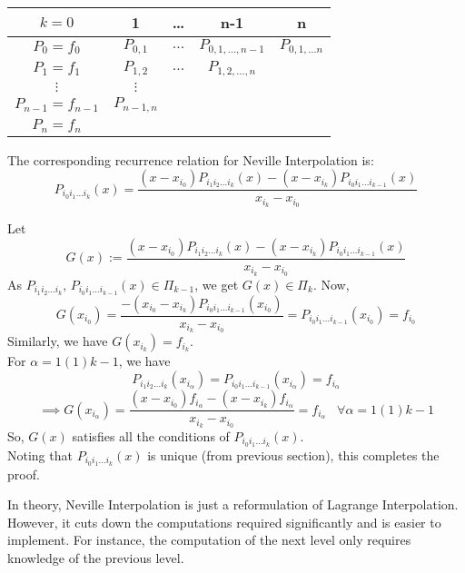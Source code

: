 \begin{center}
   \begin{tabular}{|ccccc|}
        \hline
        $k = 0$& 1 &\dots & n-1 & n\\
        \hline
        $ P_0 = f_0$& $P_{0,1}$ & $\dots$ & $P_{0,1,\dots,n-1}$ & $P_{0,1,\dots n}$\\
        $ P_1 = f_1$ & $P_{1,2}$ & $\dots$ & $P_{1,2,\dots,n}$&\\
        $\vdots$ & $\vdots$ &  &  & \\
        $ P_{n-1} = f_{n-1}$ & $P_{n-1,n}$ &  & & \\
        $ P_{n} = f_{n}$ & & & & \\
        \hline
    \end{tabular}
\end{center}



\begin{props}
    The corresponding recurrence relation for Neville Interpolation is:
    $$P_{i_0i_1\dots i_k}(x) = \frac{(x-x_{i_0})P_{i_1i_2\dots i_k}(x)-(x-x_{i_k})P_{i_0i_1\dots i_{k-1}}(x)}{x_{i_k} - x_{i_0}}$$
\end{props}
\begin{prf}
    Let $$G(x):=\frac{(x-x_{i_0})P_{i_1i_2\dots i_k}(x)-(x-x_{i_k})P_{i_0i_1\dots i_{k-1}}(x)}{x_{i_k} - x_{i_0}}$$
    As $P_{i_1i_2\dots i_k}\text{, }P_{i_0i_1\dots i_{k-1}}(x) \in \Pi_{k-1}$, we get $G(x) \in \Pi_k$.
    Now, $$G(x_{i_0}) = \frac{-(x_{i_0}-x_{i_k})P_{i_0i_1\dots i_{k-1}}(x_{i_0})}{x_{i_k} - x_{i_0}} =  P_{i_0i_1\dots i_{k-1}}(x_{i_0}) = f_{i_0}$$
    Similarly, we have $G(x_{i_k}) = f_{i_k}$.\\
    For $\alpha = 1(1)k-1$, we have 
    $$P_{i_1i_2\dots i_k}(x_{i_\alpha}) = P_{i_0i_1\dots i_{k-1}}(x_{i_\alpha}) = f_{i_\alpha}$$
    $$\implies G(x_{i_\alpha}) = \frac{(x-x_{i_0})f_{i_\alpha}-(x-x_{i_k})f_{i_\alpha}}{x_{i_k} - x_{i_0}} = f_{i_\alpha}\;\;\;\forall \alpha = 1(1)k-1$$
    So, $G(x)$ satisfies all the conditions of $P_{i_0i_1\dots i_k}(x)$.\\
    Noting that $P_{i_0i_1\dots i_k}(x)$ is unique (from previous section), this completes the proof.
\end{prf}
\begin{rmark}
    In theory, Neville Interpolation is just a reformulation of Lagrange Interpolation. However, it cuts down the computations required significantly and is easier to implement. For instance, the computation of the next level only requires knowledge of the previous level.
\end{rmark}

